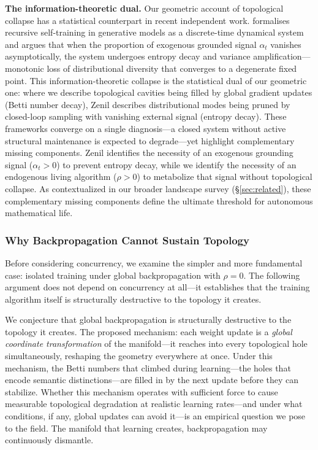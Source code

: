 \documentclass{article}
\begin{document}
\medskip
\noindent\textbf{The information-theoretic dual.}
Our geometric account of topological collapse has a statistical counterpart in recent independent work. \citet{Zenil2026limits} formalises recursive self-training in generative models as a discrete-time dynamical system and argues that when the proportion of exogenous grounded signal $\alpha_t$ vanishes asymptotically, the system undergoes entropy decay and variance amplification---monotonic loss of distributional diversity that converges to a degenerate fixed point. This information-theoretic collapse is the statistical dual of our geometric one: where we describe topological cavities being filled by global gradient updates (Betti number decay), Zenil describes distributional modes being pruned by closed-loop sampling with vanishing external signal (entropy decay). These frameworks converge on a single diagnosis---a closed system without active structural maintenance is expected to degrade---yet highlight complementary missing components. Zenil identifies the necessity of an exogenous grounding signal ($\alpha_t > 0$) to prevent entropy decay, while we identify the necessity of an endogenous living algorithm ($\rho > 0$) to metabolize that signal without topological collapse. As contextualized in our broader landscape survey (\S\ref{sec:related}), these complementary missing components define the ultimate threshold for autonomous mathematical life.


\subsubsection{Why Backpropagation Cannot Sustain Topology}

\noindent Before considering concurrency, we examine the simpler and more fundamental case: isolated training under global backpropagation with $\rho = 0$. The following argument does not depend on concurrency at all---it establishes that the training algorithm itself is structurally destructive to the topology it creates.

We conjecture that global backpropagation is structurally destructive to the topology it creates. The proposed mechanism: each weight update is a \emph{global coordinate transformation} of the manifold---it reaches into every topological hole simultaneously, reshaping the geometry everywhere at once. Under this mechanism, the Betti numbers that climbed during learning---the holes that encode semantic distinctions---are filled in by the next update before they can stabilize. Whether this mechanism operates with sufficient force to cause measurable topological degradation at realistic learning rates---and under what conditions, if any, global updates can avoid it---is an empirical question we pose to the field. The manifold that learning creates, backpropagation may continuously dismantle.
\end{document}
